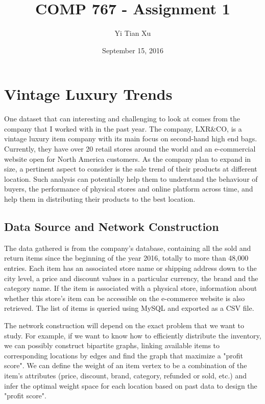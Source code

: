 \documentclass[12pt]{article}
\begin{document}
\title{COMP 767 - Assignment 1}
\author{Yi Tian Xu}
\date{September 15, 2016}
\maketitle

\section{Vintage Luxury Trends}

One dataset that can interesting and challenging to look at comes from the company that I worked with in the past year. The company, LXR{\&}CO, is a vintage luxury item company with its main focus on second-hand high end bags. Currently, they have over 20 retail stores around the world and an e-commercial website open for North America customers. As the company plan to expand in size, a pertinent aspect to consider is the sale trend of their products at different location. Such analysis can potentially help them to understand the behaviour of buyers, the performance of physical stores and online platform across time, and help them in distributing their products to the best location. 

\subsection{Data Source and Network Construction}

The data gathered is from the company's database, containing all the sold and return items since the beginning of the year 2016, totally to more than 48,000 entries. Each item has an associated store name or shipping address down to the city level, a price and discount values in a particular currency, the brand and the category name. If the item is associated with a physical store, information about whether this store's item can be accessible on the e-commerce website is also retrieved. The list of items is queried using MySQL and exported as a CSV file. 

The network construction will depend on the exact problem that we want to study. For example, if we want to know how to efficiently distribute the inventory, we can possibly construct bipartite graphs, linking available items to corresponding locations by edges and find the graph that maximize a "profit score". We can define the weight of an item vertex to be a combination of the item's attributes (price, discount, brand, category, refunded or sold, etc.) and infer the optimal weight space for each location based on past data to design the "profit score". 
\end{document}
